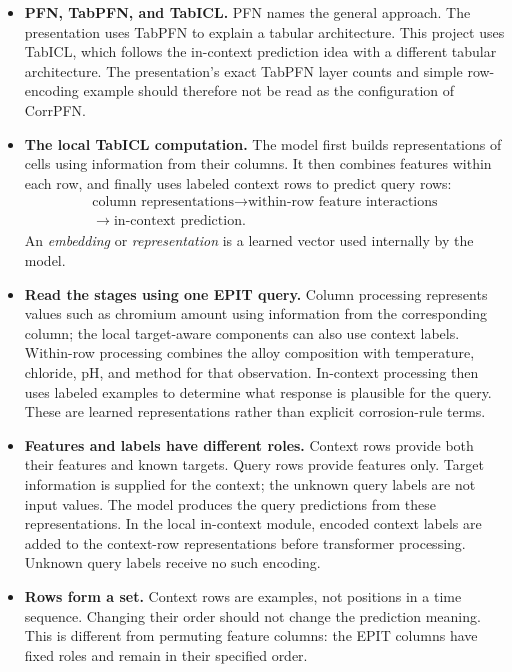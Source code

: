 \documentclass[11pt]{article}
\newenvironment{notes}
  {\begin{itemize}\setlength{\itemsep}{0.45em}\setlength{\parsep}{0pt}}
  {\end{itemize}}
\begin{document}
\begin{notes}
    \item \textbf{PFN, TabPFN, and TabICL.} PFN names the general
    approach. The presentation uses TabPFN to explain a tabular
    architecture. This project uses TabICL, which follows the
    in-context prediction idea with a different tabular architecture.
    The presentation's exact TabPFN layer counts and simple
    row-encoding example should therefore not be read as the
    configuration of CorrPFN.

    \item \textbf{The local TabICL computation.} The model first
    builds representations of cells using information from their
    columns. It then combines features within each row, and finally
    uses labeled context rows to predict query rows:
    \[
    \begin{gathered}
        \text{column representations}
        \longrightarrow \text{within-row feature interactions}\\
        \longrightarrow \text{in-context prediction}.
    \end{gathered}
    \]
    An \emph{embedding} or \emph{representation} is a learned
    vector used internally by the model.

    \item \textbf{Read the stages using one EPIT query.}
    Column processing represents values such as chromium amount
    using information from the corresponding column; the local
    target-aware components can also use context labels.
    Within-row processing combines the alloy composition with
    temperature, chloride, pH, and method for that observation.
    In-context processing then uses labeled examples to determine
    what response is plausible for the query. These are learned
    representations rather than explicit corrosion-rule terms.

    \item \textbf{Features and labels have different roles.}
    Context rows provide both their features and known targets.
    Query rows provide features only. Target information is
    supplied for the context; the unknown query labels are not
    input values. The model produces the query predictions from
    these representations.
    In the local in-context module, encoded context labels are
    added to the context-row representations before transformer
    processing. Unknown query labels receive no such encoding.

    \item \textbf{Rows form a set.} Context rows are examples,
    not positions in a time sequence. Changing their order should
    not change the prediction meaning. This is different from
    permuting feature columns: the EPIT columns have fixed roles
    and remain in their specified order.


\end{notes}
\end{document}
